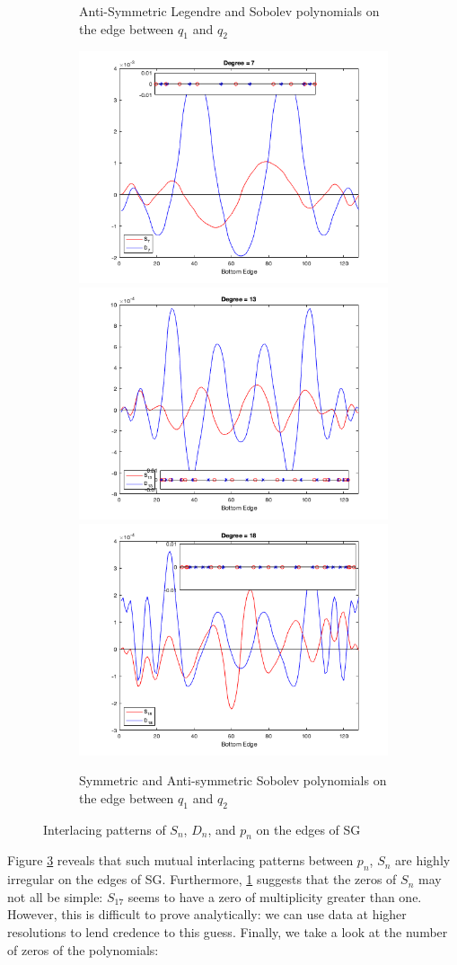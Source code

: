 \documentclass[12pt]{amsart}
\theoremstyle{plain}
\theoremstyle{definition}
\begin{document}
\begin{figure}[H]
\begin{subfigure}{\linewidth}
  \caption{Anti-Symmetric Legendre and Sobolev polynomials on the edge between $q_1$ and $q_2$}
  \label{subfig:LSBEinterlacingAS}
  \end{subfigure}\par\medskip
  \begin{subfigure}{\linewidth}
  \includegraphics[width=.32\linewidth]{images/SASSBEInterlacing/sd7.png}
  \includegraphics[width=.32\linewidth]{images/SASSBEInterlacing/sd13.png}
  \includegraphics[width=.32\linewidth]{images/SASSBEInterlacing/sd18.png}
  \caption{Symmetric and Anti-symmetric Sobolev polynomials on the edge between $q_1$ and $q_2$}
  \label{subfig:SASSBEinterlacing}
  \end{subfigure}
  \caption{Interlacing patterns of $S_n$, $D_n$, and $p_n$ on the edges of SG}
  \label{fig: Interlacing}
\end{figure}

Figure \ref{fig: Interlacing} reveals that such mutual interlacing patterns between $p_n$, $S_n$ are highly irregular on the edges of SG. Furthermore, \ref{subfig:LSBEinterlacingAS} suggests that the zeros of $S_n$ may not all be simple: $S_17$ seems to have a zero of multiplicity greater than one. However, this is difficult to prove analytically: we can use data at higher resolutions to lend credence to this guess. Finally, we take a look at the number of zeros of the polynomials: 
\end{document}
